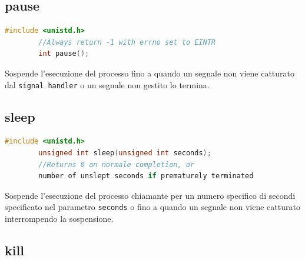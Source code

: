\documentclass[a4paper, 12pt]{book}
\begin{document}
    \subsection{pause}

    \begin{lstlisting}[language=C]
        #include <unistd.h>
        //Always return -1 with errno set to EINTR
        int pause();
    \end{lstlisting}
    Sospende l'esecuzione del processo fino a quando un segnale 
    non viene catturato dal \verb|signal handler| o un 
    segnale non gestito lo termina.

    \subsection{sleep}

    \begin{lstlisting}[language=C]
        #include <unistd.h>
        unsigned int sleep(unsigned int seconds);
        //Returns 0 on normale completion, or 
        number of unslept seconds if prematurely terminated
    \end{lstlisting}
    Sospende l'esecuzione del processo chiamante per un 
    numero specifico di secondi specificato nel parametro 
    \verb|seconds| o fino a quando un segnale non viene 
    catturato interrompendo la sospensione.

    \subsection{kill}
\end{document}
